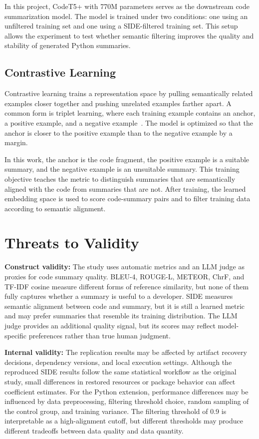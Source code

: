 \documentclass[conference]{IEEEtran}
\begin{document}
In this project, CodeT5+ with 770M parameters serves as the downstream code summarization model. The model is trained under two conditions: one using an unfiltered training set and one using a SIDE-filtered training set. This setup allows the experiment to test whether semantic filtering improves the quality and stability of generated Python summaries.

\subsection{Contrastive Learning}
Contrastive learning trains a representation space by pulling semantically related examples closer together and pushing unrelated examples farther apart. A common form is triplet learning, where each training example contains an anchor, a positive example, and a negative example~\cite{schroff2015facenet}. The model is optimized so that the anchor is closer to the positive example than to the negative example by a margin.

In this work, the anchor is the code fragment, the positive example is a suitable summary, and the negative example is an unsuitable summary. This training objective teaches the metric to distinguish summaries that are semantically aligned with the code from summaries that are not. After training, the learned embedding space is used to score code-summary pairs and to filter training data according to semantic alignment.





\section{Threats to Validity}

\textbf{Construct validity:} The study uses automatic metrics and an LLM judge as proxies for code summary quality. BLEU-4, ROUGE-L, METEOR, ChrF, and TF-IDF cosine measure different forms of reference similarity, but none of them fully captures whether a summary is useful to a developer. SIDE measures semantic alignment between code and summary, but it is still a learned metric and may prefer summaries that resemble its training distribution. The LLM judge provides an additional quality signal, but its scores may reflect model-specific preferences rather than true human judgment.

\textbf{Internal validity:} The replication results may be affected by artifact recovery decisions, dependency versions, and local execution settings. Although the reproduced SIDE results follow the same statistical workflow as the original study, small differences in restored resources or package behavior can affect coefficient estimates. For the Python extension, performance differences may be influenced by data preprocessing, filtering threshold choice, random sampling of the control group, and training variance. The filtering threshold of 0.9 is interpretable as a high-alignment cutoff, but different thresholds may produce different tradeoffs between data quality and data quantity.
\end{document}
